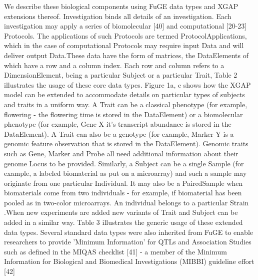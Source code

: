 \documentclass[8pt, twoside, a5paper]{report}
\begin{document}
We describe these biological components using FuGE data types and XGAP extensions thereof. Investigation binds all details of an investigation. Each investigation
may apply a series of biomolecular [40] and computational [20-23] Protocols. The applications of such Protocols are termed ProtocolApplications, which in the case
of computational Protocols may require input Data and will deliver output Data.These data have the form of matrices, the DataElements of which have a row and a
column index. Each row and column refers to a DimensionElement, being a particular Subject or a particular Trait, Table 2 illustrates the usage of these core data
types. Figure 1a, c shows how the XGAP model can be extended to accommodate details on particular types of subjects and traits in a uniform way. A Trait can be a
classical phenotype (for example, flowering - the flowering time is stored in the DataElement) or a biomolecular phenotype (for example, Gene X it's transcript 
abundance is stored in the DataElement). A Trait can also be a genotype (for example, Marker Y is a genomic feature observation that is stored in the DataElement).
Genomic traits such as Gene, Marker and Probe all need additional information about their genome Locus to be provided. Similarly, a Subject can be a single Sample
(for example, a labeled biomaterial as put on a microarray) and such a sample may originate from one particular Individual. It may also be a PairedSample when 
biomaterials come from two individuals - for example, if biomaterial has been pooled as in two-color microarrays. An individual belongs to a particular Strain
.When new experiments are added new variants of Trait and Subject can be added in a similar way. Table 3 illustrates the generic usage of these extended data types.
Several standard data types were also inherited from FuGE to enable researchers to provide 'Minimum Information' for QTLs and Association Studies such as defined 
in the MIQAS checklist [41] - a member of the Minimum Information for Biological and Biomedical Investigations (MIBBI) guideline effort [42]
\end{document}

